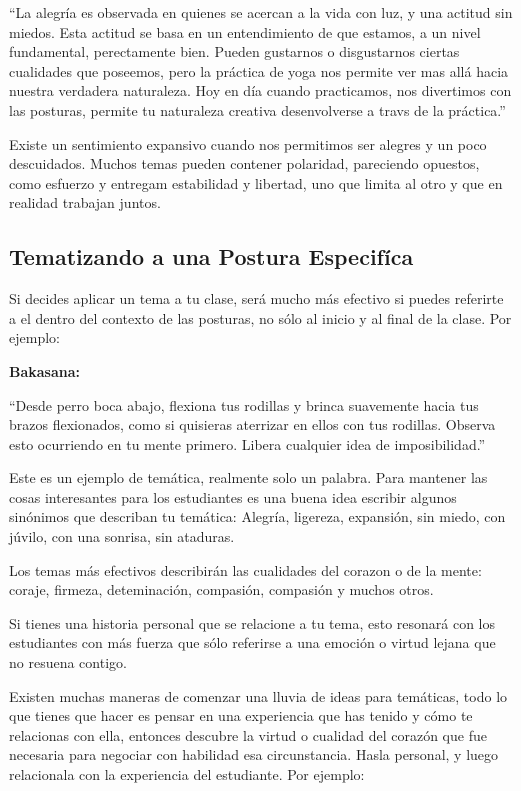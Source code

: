 ``La alegría es observada en quienes se acercan a la vida con luz, y una actitud sin miedos. Esta actitud se basa en un entendimiento de que estamos, a un nivel fundamental, perectamente bien. Pueden gustarnos o disgustarnos ciertas cualidades que poseemos, pero la práctica de yoga nos permite ver mas allá hacia nuestra verdadera naturaleza. Hoy en día cuando practicamos, nos divertimos con las posturas, permite tu naturaleza creativa desenvolverse a travs de la práctica.''

Existe un sentimiento expansivo cuando nos permitimos ser alegres y un poco descuidados. Muchos temas pueden contener polaridad, pareciendo opuestos, como esfuerzo y entregam estabilidad y libertad, uno que limita al otro y que en realidad trabajan juntos.

\subsection{Tematizando a una Postura Especifíca}
Si decides aplicar un tema a tu clase, será mucho más efectivo si puedes referirte a el dentro del contexto de las posturas, no sólo al inicio y al final de la clase. Por ejemplo:

\textbf{Bakasana:}

``Desde perro boca abajo, flexiona tus rodillas y brinca suavemente hacia tus brazos flexionados, como si quisieras aterrizar en ellos con tus rodillas. Observa esto ocurriendo en tu mente primero. Libera cualquier idea de imposibilidad.''

Este es un ejemplo de temática, realmente solo un palabra. Para mantener las cosas interesantes para los estudiantes es una buena idea escribir algunos sinónimos que describan tu temática: Alegría, ligereza, expansión, sin miedo, con júvilo, con una sonrisa, sin ataduras.

Los temas más efectivos describirán las cualidades del corazon o de la mente: coraje, firmeza, deteminación, compasión, compasión y muchos otros.

Si tienes una historia personal que se relacione a tu tema, esto resonará con los estudiantes con más fuerza que sólo referirse a una emoción o virtud lejana que no resuena contigo.

Existen muchas maneras de comenzar una lluvia de ideas para temáticas, todo lo que tienes que hacer es pensar en una experiencia que has tenido y cómo te relacionas con ella, entonces descubre la virtud o cualidad del corazón que fue necesaria para negociar con habilidad esa circunstancia. Hasla personal, y luego relacionala con la experiencia del estudiante. Por ejemplo:

